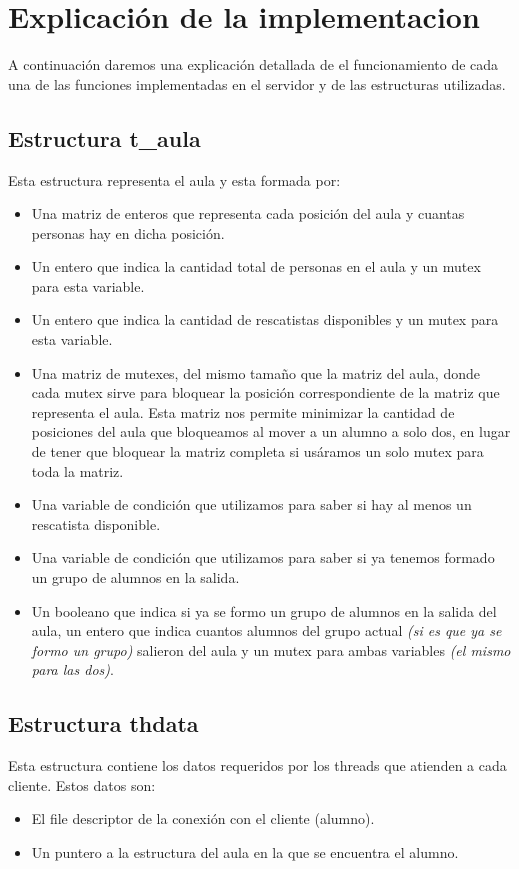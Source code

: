 \section{Explicación de la implementacion}

A continuación daremos una explicación detallada de el funcionamiento de cada una de las funciones implementadas en el servidor y de las estructuras utilizadas.


\subsection{Estructura t\_aula}

Esta estructura representa el aula y esta formada por:
\begin{itemize}
	\item Una matriz de enteros que representa cada posición del aula y cuantas personas hay en dicha posición.
	\item Un entero que indica la cantidad total de personas en el aula y un mutex para esta variable.
	\item Un entero que indica la cantidad de rescatistas disponibles y un mutex para esta variable.
	\item Una matriz de mutexes, del mismo tamaño que la matriz del aula, donde cada mutex sirve para bloquear la posición correspondiente de la matriz que representa el aula. Esta matriz nos permite minimizar la cantidad de posiciones del aula que bloqueamos al mover a un alumno a solo dos, en lugar de tener que bloquear la matriz completa si usáramos un solo mutex para toda la matriz.
	\item Una variable de condición que utilizamos para saber si hay al menos un rescatista disponible.
	\item Una variable de condición que utilizamos para saber si ya tenemos formado un grupo de alumnos en la salida.
	\item Un booleano que indica si ya se formo un grupo de alumnos en la salida del aula, un entero que indica cuantos alumnos del grupo actual \textit{(si es que ya se formo un grupo)} salieron del aula y un mutex para ambas variables \textit{(el mismo para las dos)}.
\end{itemize}


\subsection{Estructura thdata}

Esta estructura contiene los datos requeridos por los threads que atienden a cada cliente. Estos datos son:
\begin{itemize}
	\item El file descriptor de la conexión con el cliente (alumno).
	\item Un puntero a la estructura del aula en la que se encuentra el alumno.
\end{itemize}


